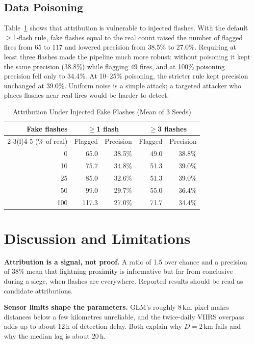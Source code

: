 \documentclass[10pt,journal,compsoc]{IEEEtran}
\begin{document}
\subsection{Data Poisoning}
Table~\ref{tab:poison} shows that attribution is vulnerable to injected flashes. With the default $\geq$1-flash rule, fake flashes equal to the real count raised the number of flagged fires from 65 to 117 and lowered precision from 38.5\% to 27.0\%. Requiring at least three flashes made the pipeline much more robust: without poisoning it kept the same precision (38.8\%) while flagging 49 fires, and at 100\% poisoning precision fell only to 34.4\%. At 10--25\% poisoning, the stricter rule kept precision unchanged at 39.0\%. Uniform noise is a simple attack; a targeted attacker who places flashes near real fires would be harder to detect.

\begin{table}[!t]
\caption{Attribution Under Injected Fake Flashes (Mean of 3 Seeds)}
\label{tab:poison}
\centering
\small
\setlength{\tabcolsep}{4pt}
\begin{tabular}{@{}rrrrr@{}}
\toprule
Fake flashes & \multicolumn{2}{c}{$\geq$1 flash} & \multicolumn{2}{c}{$\geq$3 flashes} \\
\cmidrule(lr){2-3}\cmidrule(l){4-5}
(\% of real) & Flagged & Precision & Flagged & Precision \\
\midrule
0 & 65.0 & 38.5\% & 49.0 & 38.8\% \\
10 & 75.7 & 34.8\% & 51.3 & 39.0\% \\
25 & 85.0 & 32.6\% & 51.3 & 39.0\% \\
50 & 99.0 & 29.7\% & 55.0 & 36.4\% \\
100 & 117.3 & 27.0\% & 71.7 & 34.4\% \\
\bottomrule
\end{tabular}
\end{table}

\section{Discussion and Limitations}
\textbf{Attribution is a signal, not proof.} A ratio of 1.5 over chance and a precision of 38\% mean that lightning proximity is informative but far from conclusive during a siege, when flashes are everywhere. Reported results should be read as candidate attributions.

\textbf{Sensor limits shape the parameters.} GLM's roughly 8\,km pixel makes distances below a few kilometres unreliable, and the twice-daily VIIRS overpass adds up to about 12\,h of detection delay. Both explain why $D = 2$\,km fails and why the median lag is about 20\,h.
\end{document}
